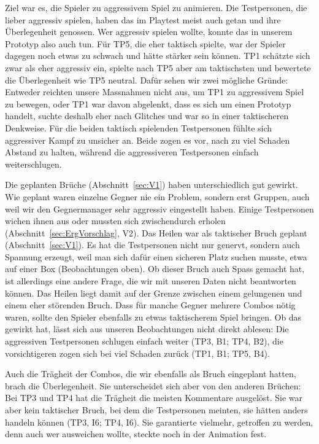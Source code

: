 \documentclass[../Main.tex]{subfiles}
\begin{document}
Ziel war es, die Spieler zu aggressivem Spiel zu animieren. Die Testpersonen, die lieber aggressiv spielen, haben das im Playtest meist auch getan und ihre Überlegenheit genossen. Wer aggressiv spielen wollte, konnte das in unserem Prototyp also auch tun. Für TP5, die eher taktisch spielte, war der Spieler dagegen noch etwas zu schwach und hätte stärker sein können. TP1 schätzte sich zwar als eher aggressiv ein, spielte nach TP5 aber am taktischsten und bewertete die Überlegenheit wie TP5 neutral. Dafür sehen wir zwei mögliche Gründe: Entweder reichten unsere Massnahmen nicht aus, um TP1 zu aggressivem Spiel zu bewegen, oder TP1 war davon abgelenkt, dass es sich um einen Prototyp handelt, suchte deshalb eher nach Glitches und war so in einer taktischeren Denkweise. Für die beiden taktisch spielenden Testpersonen fühlte sich aggressiver Kampf zu unsicher an. Beide zogen es vor, nach zu viel Schaden Abstand zu halten, während die aggressiveren Testpersonen einfach weiterschlugen.

Die geplanten Brüche (Abschnitt~\ref{sec:V1}) haben unterschiedlich gut gewirkt. Wie geplant waren einzelne Gegner nie ein Problem, sondern erst Gruppen, auch weil wir den Gegnermanager sehr aggressiv eingestellt haben. Einige Testpersonen wichen ihnen aus oder mussten sich zwischendurch erholen (Abschnitt~\ref{sec:ErgVorschlag}, V2). Das Heilen war als taktischer Bruch geplant (Abschnitt~\ref{sec:V1}). Es hat die Testpersonen nicht nur genervt, sondern auch Spannung erzeugt, weil man sich dafür einen sicheren Platz suchen musste, etwa auf einer Box (Beobachtungen oben). Ob dieser Bruch auch Spass gemacht hat, ist allerdings eine andere Frage, die wir mit unseren Daten nicht beantworten können. Das Heilen liegt damit auf der Grenze zwischen einem gelungenen und einem eher störenden Bruch. Dass für manche Gegner mehrere Combos nötig waren, sollte den Spieler ebenfalls zu etwas taktischerem Spiel bringen. Ob das gewirkt hat, lässt sich aus unseren Beobachtungen nicht direkt ablesen: Die aggressiven Testpersonen schlugen einfach weiter (TP3, B1; TP4, B2), die vorsichtigeren zogen sich bei viel Schaden zurück (TP1, B1; TP5, B4).

Auch die Trägheit der Combos, die wir ebenfalls als Bruch eingeplant hatten, brach die Überlegenheit. Sie unterscheidet sich aber von den anderen Brüchen: Bei TP3 und TP4 hat die Trägheit die meisten Kommentare ausgelöst. Sie war aber kein taktischer Bruch, bei dem die Testpersonen meinten, sie hätten anders handeln können (TP3, I6; TP4, I6). Sie garantierte vielmehr, getroffen zu werden, denn auch wer ausweichen wollte, steckte noch in der Animation fest.
\end{document}
